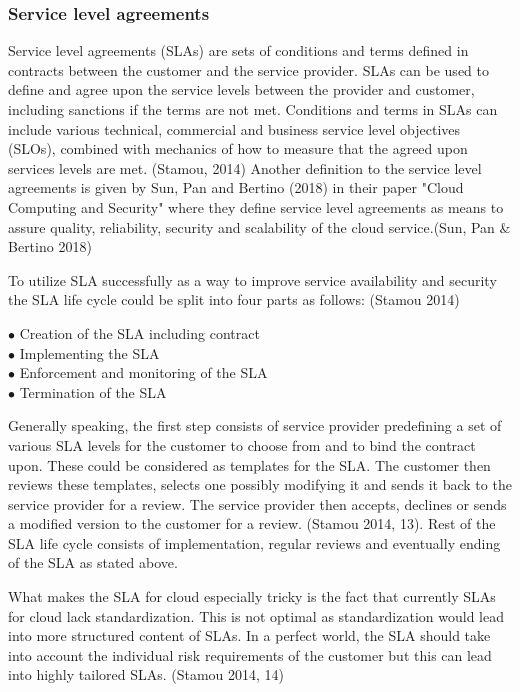 \documentclass{article}
\begin{document}
\subsubsection{Service level agreements}
Service level agreements (SLAs) are sets of conditions and terms defined in contracts between the customer and the service provider. SLAs can be used to define and agree upon the service levels between the provider and customer, including sanctions if the terms are not met. Conditions and terms in SLAs can include various technical, commercial and business service level objectives (SLOs), combined with mechanics of how to measure that the agreed upon services levels are met. (Stamou, 2014) Another definition to the service level agreements is given by Sun, Pan and Bertino (2018) in their paper "Cloud Computing and Security" where they define service level agreements as means to assure quality, reliability, security and scalability of the cloud service.(Sun, Pan \& Bertino 2018) 
\par
To utilize SLA successfully as a way to improve service availability and security the SLA life cycle could be split into four parts as follows: (Stamou 2014)
\begin{description}
        \item[$\bullet$ Creation of the SLA including contract]
        \item[$\bullet$ Implementing the SLA]
        \item[$\bullet$ Enforcement and monitoring of the SLA]
        \item[$\bullet$ Termination of the SLA]
\end{description}
Generally speaking, the first step consists of service provider predefining a set of various SLA levels for the customer to choose from and to bind the contract upon. These could be considered as templates for the SLA. The customer then reviews these templates, selects one possibly modifying it and sends it back to the service provider for a review. The service provider then accepts, declines or sends a modified version to the customer for a review. (Stamou 2014, 13). Rest of the SLA life cycle consists of implementation, regular reviews and eventually ending of the SLA as stated above.
\par
What makes the SLA for cloud especially tricky is the fact that currently SLAs for cloud lack standardization. This is not optimal as standardization would lead into more structured content of SLAs. In a perfect world, the SLA should take into account the individual risk requirements of the customer but this can lead into highly tailored SLAs. (Stamou 2014, 14)
\end{document}
